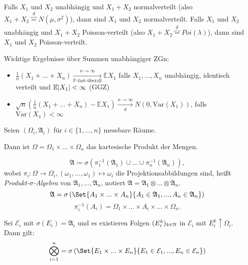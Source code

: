 \documentclass{cheat-sheet}
\newcommand{\Alg}{\mathfrak{A}} %
\renewcommand{\P}{\mathbb{P}} %
\newcommand{\E}{\mathbb{E}} %
\newcommand{\Var}{\mathrm{Var}} %
\begin{document}
\begin{satz}
  Falls $X_1$ und $X_2$ unabhängig und $X_1 + X_2$ normalverteilt (also $X_1 + X_2 \overbrace{=}^d N(\mu, \sigma^2)$), dann sind $X_1$ und $X_2$ normalverteilt.
  Falls $X_1$ und $X_2$ unabhängig und $X_1 + X_2$ Poisson-verteilt (also $X_1 + X_2 \overbrace{=}^d Poi(\lambda)$), dann sind $X_1$ und $X_2$ Poisson-verteilt.
\end{satz}

Wichtige Ergebnisse über Summen unabhängiger ZGn:

\begin{itemize}
  \item $\tfrac{1}{n}(X_1 + ... + X_n) \xrightarrow[\text{$\P$-fast-überall}]{n \to \infty} \E X_1$ falls $X_1, ..., X_n$ unabhängig, identisch verteilt und $\E \abs{X_1} < \infty$ (GGZ)
  \item $\sqrt{n} (\tfrac{1}{n}(X_1 + ... + X_n) - \E X_1) \xrightarrow[d]{n \to \infty} N(0, \Var(X_1))$, falls $\Var(X_1) < \infty$
\end{itemize}




Seien $(\Omega_i, \Alg_i)$ für $i \in \{ 1, ..., n \}$ messbare Räume.

Dann ist $\Omega = \Omega_1 \times ... \times \Omega_n$ das kartesische Produkt der Mengen.

\begin{defn}
  \[ \Alg \coloneqq \sigma \left( \pi_1^{-1}(\Alg_1) \cup ... \cup \pi_n^{-1}(\Alg_n) \right), \]
  wobei $\pi_i : \Omega \to \Omega_i, (\omega_1, ..., \omega_1) \mapsto \omega_i$ die Projektionsabbildungen sind, heißt \emph{Produkt-$\sigma$-Algebra} von $\Alg_1, ..., \Alg_n$, notiert $\Alg = \Alg_1 \otimes ... \otimes \Alg_n$.
  \[ \Alg = \sigma \left( \Set{ A_1 \times ... \times A_n }{ A_1 \in \Alg_1, ..., A_n \in \Alg_n } \right) \]
  \[ \pi_i^{-1}(A_i) = \Omega_1 \times ... \times A_i \times ... \times \Omega_n. \]
\end{defn}

\begin{lem}
  Sei $\mathcal{E}_i$ mit $\sigma(E_i) = \Alg_i$ und es existieren Folgen $(E_i^k)_{k \in \mathbb{N}}$ in $\mathcal{E}_i$ mit $E_i^k \uparrow \Omega_i$. Dann gilt:
  \[ \bigotimes_{i=1}^n = \sigma \left( \Set{ E_1 \times ... \times E_n }{ E_1 \in \mathcal{E}_1, ..., E_n \in \mathcal{E}_n } \right) \]
\end{lem}
\end{document}
